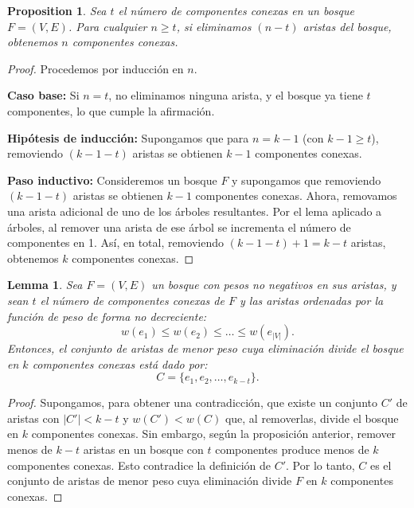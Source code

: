 \documentclass[12pt]{article}
\newtheorem{lemma}{Lemma}
\newtheorem{proposition}{Proposition}
\begin{document}
\begin{proposition}
Sea \( t \) el número de componentes conexas en un bosque \( F = (V, E) \). Para cualquier \( n \ge t \), si eliminamos \( (n-t) \) aristas del bosque, obtenemos \( n \) componentes conexas.
\end{proposition}

\begin{proof}
Procedemos por inducción en \( n \).

\textbf{Caso base:}  
Si \( n = t \), no eliminamos ninguna arista, y el bosque ya tiene \( t \) componentes, lo que cumple la afirmación.

\textbf{Hipótesis de inducción:}  
Supongamos que para \( n = k-1 \) (con \( k-1 \ge t \)), removiendo \( (k-1 - t) \) aristas se obtienen \( k-1 \) componentes conexas.

\textbf{Paso inductivo:}  
Consideremos un bosque \( F \) y supongamos que removiendo \( (k-1-t) \) aristas se obtienen \( k-1 \) componentes conexas.  
Ahora, removamos una arista adicional de uno de los árboles resultantes. Por el lema aplicado a árboles, al remover una arista de ese árbol se incrementa el número de componentes en 1.  
Así, en total, removiendo \( (k-1-t) + 1 = k-t \) aristas, obtenemos \( k \) componentes conexas.  
\end{proof}

\begin{lemma}
Sea \( F = (V, E) \) un bosque con pesos no negativos en sus aristas, y sean \( t \) el número de componentes conexas de \( F \) y las aristas ordenadas por la función de peso de forma no decreciente:
\[
w(e_1) \le w(e_2) \le \dots \le w(e_{|V|}).
\]
Entonces, el conjunto de aristas de menor peso cuya eliminación divide el bosque en \( k \) componentes conexas está dado por:
\[
C = \{ e_1, e_2, \dots, e_{k-t} \}.
\]
\end{lemma}

\begin{proof}
Supongamos, para obtener una contradicción, que existe un conjunto \( C' \) de aristas con \( |C'| < k-t \) y \( w(C') < w(C) \) que, al removerlas, divide el bosque en \( k \) componentes conexas.  
Sin embargo, según la proposición anterior, remover menos de \( k-t \) aristas en un bosque con \( t \) componentes produce menos de \( k \) componentes conexas.  
Esto contradice la definición de $C'$.  
Por lo tanto, \( C \) es el conjunto de aristas de menor peso cuya eliminación divide \( F \) en \( k \) componentes conexas.
\end{proof}
\end{document}
